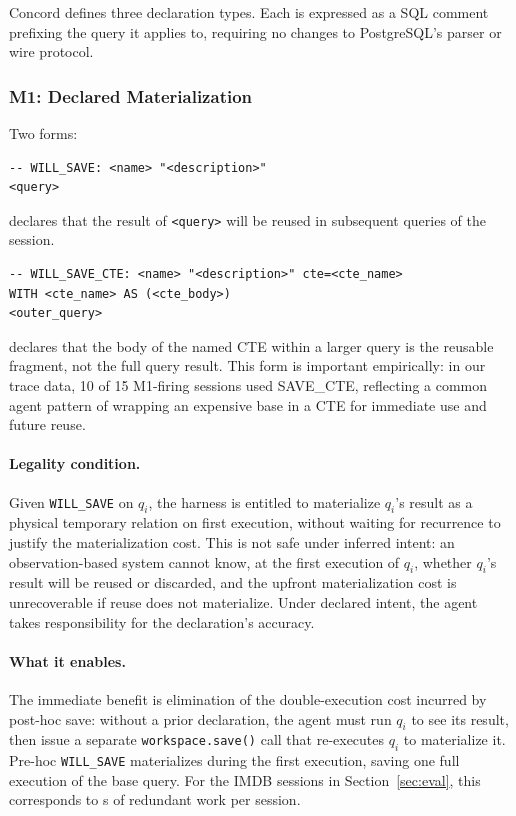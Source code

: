 Concord defines three declaration types. Each is expressed as a SQL comment prefixing the query it applies to, requiring no changes to PostgreSQL's parser or wire protocol.

\subsubsection{M1: Declared Materialization}
\label{sec:protocol:m1}

Two forms:

\begin{verbatim}
-- WILL_SAVE: <name> "<description>"
<query>
\end{verbatim}
declares that the result of \texttt{<query>} will be reused in subsequent queries of the session.

\begin{verbatim}
-- WILL_SAVE_CTE: <name> "<description>" cte=<cte_name>
WITH <cte_name> AS (<cte_body>)
<outer_query>
\end{verbatim}
declares that the body of the named CTE within a larger query is the reusable fragment, not the full query result. This form is important empirically: in our trace data, 10 of 15 M1-firing sessions used SAVE\_CTE, reflecting a common agent pattern of wrapping an expensive base in a CTE for immediate use and future reuse.

\paragraph{Legality condition.}
Given \texttt{WILL\_SAVE} on $q_i$, the harness is entitled to materialize $q_i$'s result as a physical temporary relation on first execution, without waiting for recurrence to justify the materialization cost. This is not safe under inferred intent: an observation-based system cannot know, at the first execution of $q_i$, whether $q_i$'s result will be reused or discarded, and the upfront materialization cost is unrecoverable if reuse does not materialize. Under declared intent, the agent takes responsibility for the declaration's accuracy.

\paragraph{What it enables.}
The immediate benefit is elimination of the double-execution cost incurred by post-hoc save: without a prior declaration, the agent must run $q_i$ to see its result, then issue a separate \texttt{workspace.save()} call that re-executes $q_i$ to materialize it. Pre-hoc \texttt{WILL\_SAVE} materializes during the first execution, saving one full execution of the base query. For the IMDB sessions in Section~\ref{sec:eval}, this corresponds to s of redundant work per session.

